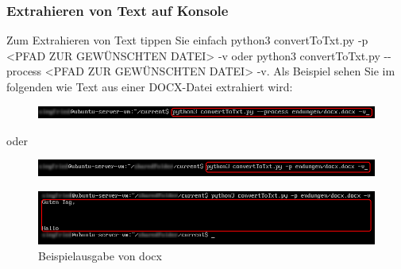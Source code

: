 \documentclass[12pt]{scrartcl}
\begin{document}
\subsubsection{Extrahieren von Text auf Konsole}
\label{sec:first-steps-extraction-console}
Zum Extrahieren von Text tippen Sie einfach	
python3 convertToTxt.py -p <PFAD ZUR GEWÜNSCHTEN DATEI> -v oder python3 convertToTxt.py -{}-process <PFAD ZUR GEWÜNSCHTEN DATEI> -v.
Als Beispiel sehen Sie im folgenden wie Text aus einer DOCX-Datei extrahiert wird:
\begin{figure}[htbp]
\includegraphics[width=1.0\textwidth]{ersteSchritteExtract001}\par\vspace{0.25cm}
\label{fig:ersteSchritteExtract001}
\end{figure}
\begin{center}
oder
\end{center}
\begin{figure}[htbp]
\includegraphics[width=1.0\textwidth]{ersteSchritteExtract002}\par\vspace{0.25cm}
\label{fig:ersteSchritteExtract002}
\end{figure}
\begin{figure}[htbp]
\includegraphics[width=1.0\textwidth]{ersteSchritteExtract003}\par\vspace{0.25cm}
\caption{Beispielausgabe von docx}
\label{fig:ersteSchritteExtract003}
\end{figure}
\newpage
\end{document}
